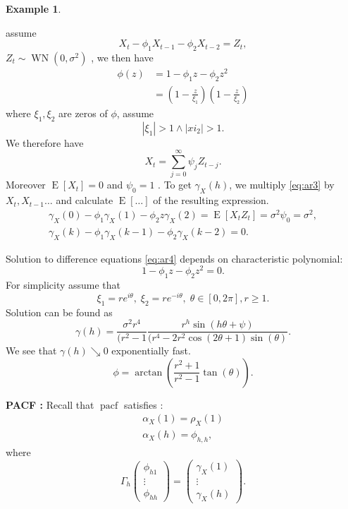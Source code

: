 \documentclass[12pt,a4paper, notitlepage]{book}
\theoremstyle{definition} %
\newtheorem{example}{Example}[chapter]
\theoremstyle{plain} %
\DeclareMathOperator{\E}{E}
\DeclareMathOperator{\Pacf}{pacf}
\DeclareMathOperator{\Wn}{WN}
\begin{document}
\begin{example}
\begin{enumerate}[alph]
assume 
\[  X_t - \phi _1 X_{t-1} - \phi _2 X_{t-2} = Z_t  \label{eq:ar3} , \]
$  Z_t \sim \Wn(0, \sigma^2 ) $ , we then have
\begin{align*} \phi(z) & =  1 - \phi _1 z - \phi _2 z^2 \\
 & = \left( 1 - \frac{z}{ \xi _1} \right) \left( 1 - \frac{z}{\xi_2} \right)  
\end{align*}
where $ \xi _1 , \xi _2 $ are zeros of $ \phi $, assume
\[ | \xi _1| >1 \wedge  |xi _2 | > 1 . \]
We therefore have
\[ X_t = \sum _{j=0} ^{\infty} \psi _j Z_{t-j} . \]
Moreover $  \E [X_t] = 0 $ and $ \psi _0 = 1 $ . To get 
$ \gamma _X (h) $, we multiply \ref{eq:ar3} by $ X_t , X_{t-1} \ldots  $ and calculate $ \E[ \ldots ] $ of the resulting expression.
\begin{align*} \gamma _X (0) - \phi _1 \gamma _X (1) - \phi _2 z\gamma _X(2) = \E[X_t Z_t] = \sigma ^2 \psi _0  = \sigma ^2 , \\
\gamma _X(k) - \phi _1 \gamma _X(k-1) - \phi_2 \gamma_X(k-2) = 0 . \label{eq:ar4} \end{align*}

Solution to difference equations \ref{eq:ar4} depends on characteristic polynomial:
\[ 1 - \phi _1 z - \phi _2 z^2 = 0 . \]
For simplicity assume that 
\[ \xi _1 = r e^{i \theta} , \; \xi _2 = r e^{- i \theta } , \; \theta \in [0, 2 \pi ], r \geq 1 . \]
Solution can be found as 
\[ \gamma(h) = \frac{ \sigma ^2 r ^4}{(r^2 - 1}  \frac{r^h \sin(h \theta + \psi ) } { (r^4 - 2 r^2 \cos(2 \theta + 1) \sin(\theta) } . \]
We see that $ \gamma (h) \searrow 0 $ exponentially fast. 
 \[ \phi = \arctan\left( \frac{r^2 + 1}{r^2 -1} \tan(\theta) \right) . \]

\end{enumerate}
\end{example}



{\bf PACF :} Recall that $ \Pacf $ satisfies :
\begin{align*} 
\alpha _X(1) = \rho _X(1)  \\
\alpha _X(h) = \phi _{h,h} ,
\end{align*}
where 
\[ \Gamma _h \left( \begin{array}{c}  \phi _{h1} \\ \vdots \\ \phi _{hh} \end{array} \right) = \left( \begin{array}{c} \gamma _X(1) \\ 
\vdots \\ \gamma _X(h) \end{array} \right) . \]
\end{document}
